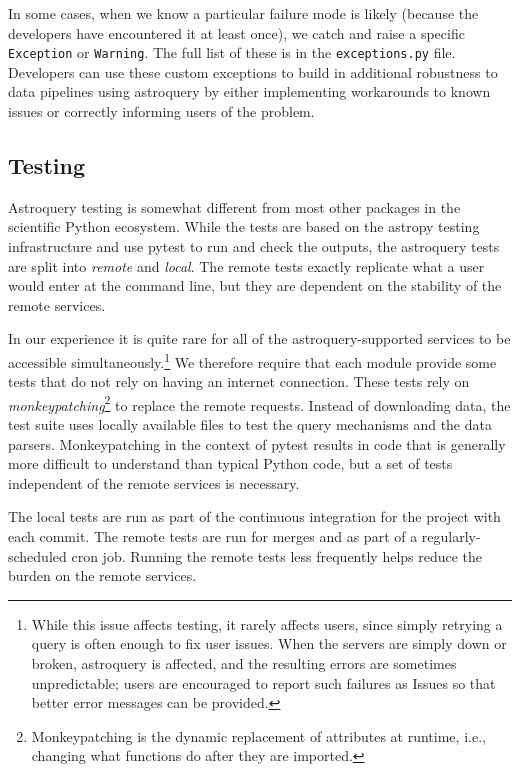 \documentclass[twocolumn]{aastex62}
\begin{document}
In some cases, when we know a particular failure mode is likely (because the
developers have encountered it at least once), we catch and raise a specific
\texttt{Exception} or \texttt{Warning}.  The full list of these is in the
\texttt{exceptions.py} file.  Developers can use these custom exceptions
to build in additional robustness to data pipelines using astroquery
by either implementing workarounds to known issues or correctly informing
users of the problem.

\subsection{Testing}
Astroquery testing is somewhat different from most other packages in the
scientific Python
ecosystem.  While the tests are based on the astropy testing infrastructure and use
pytest to run and check the outputs, the astroquery tests are split into
\emph{remote} and \emph{local}.  The remote tests exactly replicate what a user
would enter at the command line, but they are dependent on the stability of the
remote services.

In our experience it is quite rare for all of the astroquery-supported
services to be accessible simultaneously.\footnote{While this issue affects
testing, it rarely affects users, since simply retrying a query is often
enough to fix user issues.  When the servers are simply down or broken,
astroquery is affected, and the resulting errors are sometimes unpredictable;
users are encouraged to report such failures as Issues so that better error
messages can be provided.} We therefore require that each
module provide some tests that do not rely on having an internet connection.
These tests rely on \emph{monkeypatching}\footnote{Monkeypatching is the
  dynamic replacement of attributes at runtime, i.e., changing what
  functions do after they are imported.} to replace the remote
requests. Instead of downloading data, the test suite uses locally available
files to test the query mechanisms and the data parsers.  Monkeypatching in
the context of pytest results in code that is generally more
difficult to understand than typical Python code, but a set of tests
independent of the remote services is necessary.

The local tests are run as part of the continuous integration for the
project with each commit.  The remote tests are run for merges and as part of a
regularly-scheduled cron job.  Running the remote tests less frequently
helps reduce the burden on the remote services.
\end{document}
